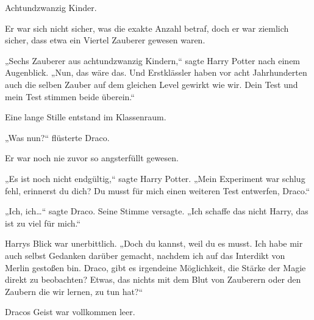 Achtundzwanzig Kinder.

Er war sich nicht sicher, was die exakte Anzahl betraf, doch er war ziemlich sicher, dass etwa ein Viertel Zauberer gewesen waren.

„Sechs Zauberer aus achtundzwanzig Kindern,“ sagte Harry Potter nach einem Augenblick. „Nun, das wäre das. Und Erstklässler haben vor acht Jahrhunderten auch die selben Zauber auf dem gleichen Level gewirkt wie wir. Dein Test und mein Test stimmen beide überein.“

Eine lange Stille entstand im Klassenraum.

„Was nun?“ flüsterte Draco.

Er war noch nie zuvor so angsterfüllt gewesen.

„Es ist noch nicht endgültig,“ sagte Harry Potter. „Mein Experiment war schlug fehl, erinnerst du dich? Du musst für mich einen weiteren Test entwerfen, Draco.“

„Ich, ich…“ sagte Draco. Seine Stimme versagte. „Ich schaffe das nicht Harry, das ist zu viel für mich.“

Harrys Blick war unerbittlich. „Doch du kannst, weil du es musst. Ich habe mir auch selbst Gedanken darüber gemacht, nachdem ich auf das Interdikt von Merlin gestoßen bin. Draco, gibt es irgendeine Möglichkeit, die Stärke der Magie direkt zu beobachten? Etwas, das nichts mit dem Blut von Zauberern oder den Zaubern die wir lernen, zu tun hat?“

Dracos Geist war vollkommen leer.

